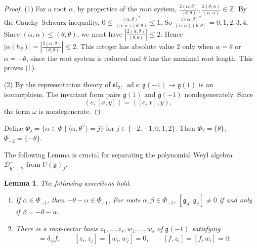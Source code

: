 \documentclass[12pt,a4paper]{amsart}
\numberwithin{equation}{section}
\newtheorem{lemma}[theorem]{Lemma}
\theoremstyle{definition}
\theoremstyle{remark}
\newcommand{\g}{\mathfrak g}
\newcommand{\h}{\mathfrak h}
\newcommand{\D}{\mathcal D}
\newcommand{\Z}{\mathbb Z}
\newcommand{\ad}{\operatorname{ad}}
\newcommand{\Uf}{U(\g)_f}
\begin{document}
\begin{proof}
(1) For a root \(\alpha\), by properties of the root system,
$\frac{2(\alpha,\theta)}{(\theta,\theta)}, \frac{2(\theta,\alpha)}{(\alpha,\alpha)}\in \Z$.
By the
Cauchy--Schwarz inequality, $0\leq \frac{(\alpha,\theta)^2}{(\alpha,\alpha)(\theta,\theta)}\leq 1$. So $\frac{4(\alpha,\theta)^2}{(\alpha,\alpha)(\theta,\theta)}=0,1,2,3,4$.
Since $(\alpha,\alpha)\leq (\theta,\theta)$,
 we must have $\left|\frac{2(\alpha,\theta)}{(\theta,\theta)}\right|\leq 2$. Hence
$|\alpha(h_\theta)|
 =\left|\frac{2(\alpha,\theta)}{(\theta,\theta)}\right|
 \leq2$.
This integer has absolute value \(2\) only when
\(\alpha=\theta\) or \(\alpha=-\theta\), since the root system is reduced
and \(\theta\) has the maximal root length. This proves (1).

(2) By the representation theory of \(\mathfrak{sl}_2\),
\(\ad e:\g(-1)\to\g(1)\) is an isomorphism.
The invariant form pairs \(\g(1)\) and \(\g(-1)\) nondegenerately.
Since
\[
 (e,[x,y])=([e,x],y),
\]
the form \(\omega\) is nondegenerate.

\end{proof}

Define $
\Phi_j=\{\alpha\in\Phi\mid \langle\alpha,\theta^\vee\rangle=j\}$ for $j\in\{-2,-1,0,1,2\}$. Then $\Phi_2=\{\theta\}$, $\Phi_{-2}=\{-\theta\}$.

The following Lemma is crucial for separating the polynomial Weyl algebra $\D^+_{\h^\vee-2}$ from $\Uf$.

\begin{lemma}
\label{lem:short-grading2}
The following assertions hold.
\begin{enumerate}
\item If $\alpha\in\Phi_{-1}$, then $-\theta-\alpha\in\Phi_{-1}$. For  roots  $\alpha, \beta\in \Phi_{-1}$, $[\g_\alpha,\g_\beta]\neq 0$ if and only if $\beta=-\theta-\alpha$.
\item There is a root-vector basis \(z_1,\ldots,z_s,w_1,\ldots,w_s\) of $\g(-1)$
satisfying\begin{equation}
 [w_i,z_j]=\delta_{ij}f,\qquad
 [z_i,z_j]=[w_i,w_j]=0,\qquad
 [f,z_i]=[f,w_i]=0.
\end{equation}
\end{enumerate}
\end{lemma}
\end{document}
